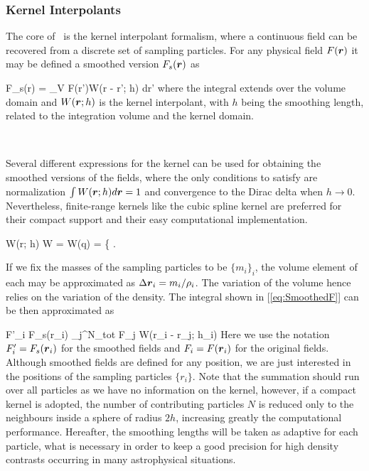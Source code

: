 \documentclass[a4,useAMS,usenatbib,usegraphicx,12pt]{article}
\begin{document}
\subsubsection*{Kernel Interpolants}

The core of \SPH\ is the kernel interpolant formalism, where a continuous field 
can be recovered from a discrete set of sampling particles. For any physical 
field $F(\boldsymbol{ r })$ it may be defined a smoothed version $F_s(\boldsymbol{ r })$ as

{ F_s(\bds r) = \int_V \bds F(\bds r')W(\bds r - \bds r'; h) d\bds r' }
where the integral extends over the volume domain and $W(\boldsymbol{ r };h)$ is the 
kernel interpolant, with $h$ being the smoothing length, related to the 
integration volume and the kernel domain. 

\

Several different expressions for the kernel can be used for obtaining the 
smoothed versions of the fields, where the only conditions to satisfy are 
normalization $\int W(\boldsymbol{ r }; h)d\boldsymbol{ r }= 1$ and convergence to the Dirac delta 
when $h\rightarrow 0$. Nevertheless, finite-range kernels like the cubic spline 
kernel are preferred for their compact support and their easy computational 
implementation.

{ W(r; h) \equiv W = W(q) = 
\left\{  \right. }

If we fix the masses of the sampling particles to be $\{m_i\}_i$, the volume
element of each may be approximated as $\Delta \boldsymbol{ r }_i = m_i/\rho_i$. The 
variation of the volume hence relies on the variation of the density. The 
integral shown in [\ref{eq:SmoothedF}] can be then approximated as

{ F'_i \equiv F_s(\bds r_i) \approx \sum_j^{N_{tot}} F_j 
W(\bds r_i - \bds r_j; h_i) }
Here we use the notation $F'_i = F_s(\boldsymbol{ r }_i)$ for the smoothed fields and $F_i 
= F(\boldsymbol{ r }_i)$ for the original fields. Although smoothed fields are defined
for any position, we are just interested in the positions of the sampling 
particles $\{r_i\}$. Note that the summation should run over all particles as 
we have no information on the kernel, however, if a compact kernel is adopted, 
the number of contributing particles $N$ is reduced only to the neighbours 
inside a sphere of radius $2h$, increasing greatly the computational performance.
Hereafter, the smoothing lengths will be taken as adaptive for each particle, 
what is necessary in order to keep a good precision for high density contrasts 
occurring in many astrophysical situations.
\end{document}
